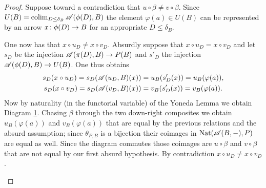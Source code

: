 \begin{proof}
  Suppose toward a contradiction that \(u\circ\beta\not= v\circ\beta\). Since \(U(B) = \operatorname*{colim}_{D\leq\delta_B}{\mathscr A}(\phi(D),B)\) the element \(\varphi(a)\in U(B)\) can be represented by an arrow \(x\colon \phi(D)\to B\) for an appropriate \(D\leq\delta_B\). 

  One now has that \(x\circ u_D\not=x\circ v_D\). Absurdly suppose that \(x\circ u_D = x\circ v_D\) and let \(s_D\) be the injection \({\mathscr A}(\pi(D),B)\to P(B)\) and \(s'_D\) the injection \({\mathscr A}(\phi(D),B)\to U(B)\). One thus obtains
  \begin{gather*}
    s_D(x\circ u_D) = s_D({\mathscr A}(u_D,B)(x)) = u_B(s'_D(x)) = u_B(\varphi(a)),\\
    s_D(x\circ v_D) = s_D({\mathscr A}(v_D,B)(x)) = v_B(s'_D(x)) = v_B(\varphi(a)).
  \end{gather*}
  Now by naturality (in the functorial variable) of the Yoneda Lemma we obtain Diagram \ref{diagram:y3}. Chasing \(\beta\) through the two down-right composites we obtain \(u_B(\varphi(a))\) and \(v_B(\varphi(a))\) that are equal by the previous relations and the absurd assumption; since \(\theta_{P,B}\) is a bijection their coimages in \(\text{\normalfont Nat}({\mathscr A}(B,-),P)\) are equal as well. Since the diagram commutes those coimages are \(u\circ\beta\) and \(v\circ\beta\) that are not equal by our first absurd hypothesis. By contradiction \(x\circ u_D\not= x\circ v_D\).
  \begin{figure}[ht]
    \begin{center}
    \end{center}
    \caption{}
    \label{diagram:y3}
  \end{figure}


\end{proof}
